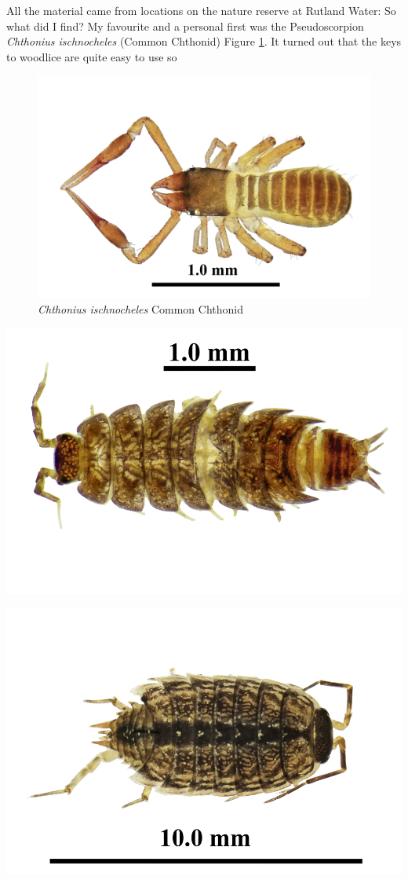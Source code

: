 \documentclass[
]{article}
\begin{document}
All the material came from locations on the nature reserve at Rutland Water: So what did I find? My favourite and a personal first was the Pseudoscorpion \emph{Chthonius ischnocheles} (Common Chthonid) Figure \ref{fig:Chthoniusischnocheles}. It turned out that the keys to woodlice are quite easy to use so

\begin{figure}

{\centering \includegraphics[width=0.8\linewidth]{images/LRES-1} 

}

\caption{ \textit{Chthonius ischnocheles} Common Chthonid  }\label{fig:Chthoniusischnocheles}
\end{figure}

\begin{center}\includegraphics[width=0.8\linewidth]{images/LRES-2} \end{center}

\begin{center}\includegraphics[width=0.8\linewidth]{images/LRES-3} \end{center}
\end{document}
